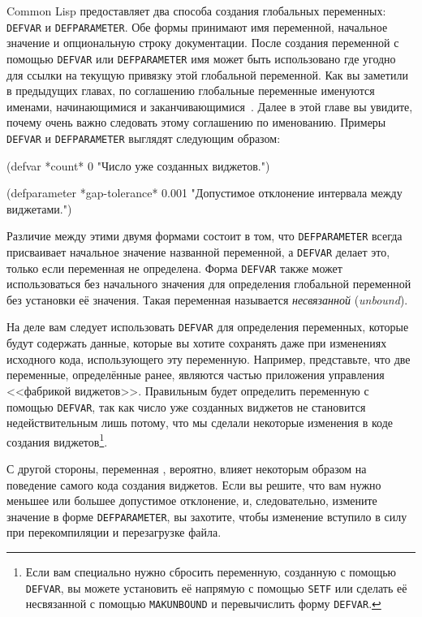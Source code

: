 Common Lisp предоставляет два способа создания глобальных переменных: \lstinline{DEFVAR} и
\lstinline{DEFPARAMETER}. Обе формы принимают имя переменной, начальное значение и
опциональную строку документации. После создания переменной с помощью \lstinline{DEFVAR} или
\lstinline{DEFPARAMETER} имя может быть использовано где угодно для ссылки на текущую
привязку этой глобальной переменной. Как вы заметили в предыдущих главах, по соглашению
глобальные переменные именуются именами, начинающимися и заканчивающимися~\code{*}.  Далее в этой
главе вы увидите, почему очень важно следовать этому соглашению по именованию. Примеры
\lstinline{DEFVAR} и \lstinline{DEFPARAMETER} выглядят следующим образом:

\begin{myverb}
  (defvar *count* 0
    "Число уже созданных виджетов.")

  (defparameter *gap-tolerance* 0.001
    "Допустимое отклонение интервала между виджетами.")
\end{myverb}

Различие между этими двумя формами состоит в том, что \lstinline{DEFPARAMETER} всегда
присваивает начальное значение названной переменной, а \lstinline{DEFVAR} делает это, только
если переменная не определена. Форма \lstinline{DEFVAR} также может использоваться без
начального значения для определения глобальной переменной без установки её значения. Такая
переменная называется \textit{несвязанной} (\textit{unbound}).

На деле вам следует использовать \lstinline{DEFVAR} для определения переменных, которые
будут содержать данные, которые вы хотите сохранять даже при изменениях исходного кода,
использующего эту переменную. Например, представьте, что две переменные, определённые
ранее, являются частью приложения управления <<фабрикой
виджетов>>. Правильным будет определить переменную  с помощью
\lstinline{DEFVAR}, так как число уже созданных виджетов не становится недействительным
лишь потому, что мы сделали некоторые изменения в коде создания виджетов\footnote{Если вам
  специально нужно сбросить переменную, созданную с помощью \lstinline{DEFVAR}, вы можете
  установить её напрямую с помощью \lstinline{SETF} или сделать её несвязанной с помощью
  \lstinline{MAKUNBOUND} и перевычислить форму \lstinline{DEFVAR}.}.

С другой стороны, переменная , вероятно, влияет некоторым образом на
поведение самого кода создания виджетов. Если вы решите, что вам нужно меньшее или большее
допустимое отклонение, и, следовательно, измените значение в форме
\lstinline{DEFPARAMETER}, вы захотите, чтобы изменение вступило в силу при перекомпиляции
и перезагрузке файла.

